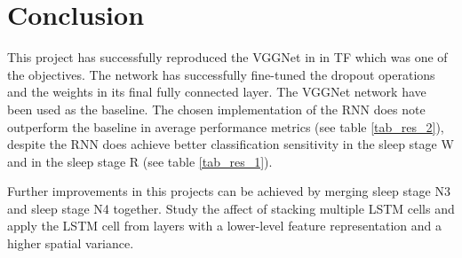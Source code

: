 \section{Conclusion}
\label{sec:conclusion}

This project has successfully reproduced the VGGNet in \cite{main_ar} in TF which was one of the objectives. The network has successfully fine-tuned the dropout operations and the weights in its final fully connected layer. 
The VGGNet network have been used as the baseline. The chosen implementation of the RNN does note outperform the baseline in average performance metrics (see table \ref{tab_res_2}), despite the RNN does achieve better classification sensitivity in the sleep stage W and in the sleep stage R (see table \ref{tab_res_1}). 

Further improvements in this projects can be achieved by merging sleep stage N3 and sleep stage N4 together. Study the affect of stacking multiple LSTM cells and apply the LSTM cell from layers with a lower-level feature representation and a higher spatial variance.